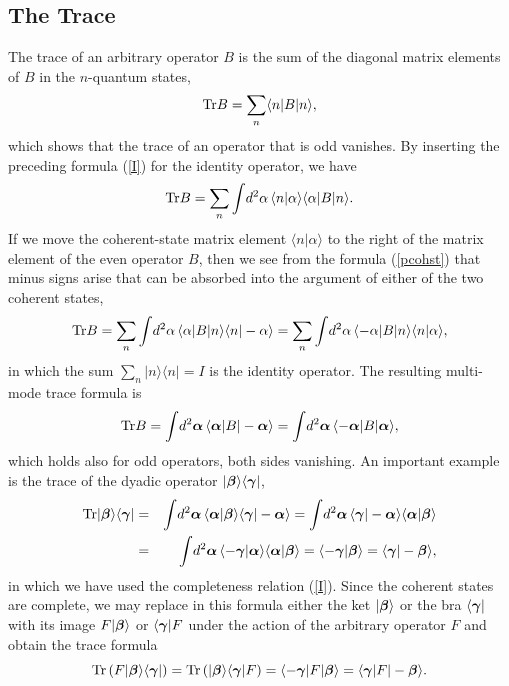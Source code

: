 \documentclass[12pt]{article}
\def\beq{\begin{equation}}
\def\eeq{\end{equation}}
\def\bea{\begin{eqnarray}}
\def\eea{\end{eqnarray}}
\def\a{\alpha}
\def\ba{{\mbox{\boldmath$\alpha$}}}
\def\bb{{\mbox{\boldmath$\beta$}}}
\def\bc{{\mbox{\boldmath$\gamma$}}}
\def\nn{\nonumber}
\def\Tr{{\rm Tr}}
\def\op{operator }
\def\opp{operator}
\begin{document}
\subsection{The Trace}
The trace of an arbitrary \op $ B $
is the sum of the diagonal matrix
elements of $ B $ in the $n$-quantum states,
\beq
\Tr B = \sum_n \langle n | B | n \rangle ,
\label {sumtr}
\eeq
which shows that the trace of an operator 
that is odd vanishes.
By inserting the preceding formula (\ref {I})
for the identity \opp, we have
\beq
\Tr B = \sum_n \int \! d^2 \a \, \langle n | \a \rangle
\langle \a | B | n \rangle .
\label {sumtr2}
\eeq
If we move the coherent-state matrix element
$ \langle n | \a \rangle $ to the right
of the matrix element of the even \op $ B $,
then we see from the formula (\ref{pcohst})
that minus signs arise that can be absorbed
into the argument of either of the two coherent states,
\beq
\Tr B = \sum_n \int \! d^2 \a \, 
\langle \a | B | n \rangle \langle n | - \a \rangle 
= \sum_n \int \! d^2 \a \, 
\langle - \a | B | n \rangle \langle n | \a \rangle ,
\label {sumtr3}
\eeq
in which the sum $ \sum_n | n \rangle \langle n | = I $
is the identity \opp.
The resulting multi-mode trace formula is
\beq
\Tr B = \int \! d^2 \ba 
\, \langle \ba | B | - \ba \rangle 
= \int \! d^2 \ba \, \langle - \ba | B | \ba \rangle ,
\label {trace}
\eeq
which holds also for odd operators, both sides vanishing.
An important example is the trace of the dyadic
operator $ | \bb \rangle \langle \bc | $,
\bea
\Tr | \bb \rangle \langle \bc | & = &
\int \! d^2 \ba \, \langle \ba | \bb \rangle \langle \bc | - \ba \rangle
= \int \! d^2 \ba \, \langle \bc | - \ba \rangle \langle \ba | \bb \rangle 
\nn\\
& = & \int \! d^2 \ba \, \langle - \bc | \ba \rangle \langle \ba | \bb \rangle 
= \langle - \bc | \bb \rangle = 
\langle \bc | - \bb \rangle ,
\label {trex}
\eea
in which we have used the completeness relation (\ref {I}).
Since the coherent states are complete,
we may replace in this formula either the ket $ | \bb \rangle $
or the bra $ \langle \bc | $ 
with its image $ F | \bb \rangle $ 
or $ \langle \bc | F $ under the action of the
arbitrary \op $ F $ and obtain the trace formula
\beq
\Tr \left( F | \bb \rangle \langle \bc | \right) = 
\Tr \left( | \bb \rangle \langle \bc | F \right) =
\langle - \bc | F | \bb \rangle = \langle \bc | F | - \bb \rangle .
\label {trFdy}
\eeq
 
\end{document}
